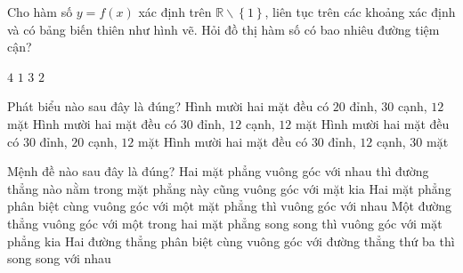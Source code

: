 \begin{ex}%
	Cho hàm số $y=f(x)$ xác định trên $\mathbb{R}\backslash\left\{1\right\}$, liên tục trên các khoảng xác định và có bảng biến thiên như hình vẽ. Hỏi đồ thị hàm số có bao nhiêu đường tiệm cận?
	\begin{center}
	\end{center}
	\choice
	{$4$}
	{$1$}
	{$3$}
	{\True $2$}
\end{ex}
\begin{ex}%
	Phát biểu nào sau đây là đúng?
	\choice
	{\True Hình mười hai mặt đều có $20$ đỉnh, $30$ cạnh, $12$ mặt}
	{Hình mười hai mặt đều có $30$ đỉnh, $12$ cạnh, $12$ mặt}
	{Hình mười hai mặt đều có $30$ đỉnh, $20$ cạnh, $12$ mặt}
	{Hình mười hai mặt đều có $30$ đỉnh, $12$ cạnh, $30$ mặt}
	\loigiai{
	}
\end{ex}
\begin{ex}%
	Mệnh đề nào sau đây là đúng?
	\choice
	{Hai mặt phẳng vuông góc với nhau thì đường thẳng nào nằm trong mặt phẳng này cũng vuông góc với mặt kia}
	{Hai mặt phẳng phân biệt cùng vuông góc với một mặt phẳng thì vuông góc với nhau}
	{\True Một đường thẳng vuông góc với một trong hai mặt phẳng song song thì vuông góc với mặt phẳng kia}
	{Hai đường thẳng phân biệt cùng vuông góc với đường thẳng thứ ba thì song song với nhau}
\end{ex}

